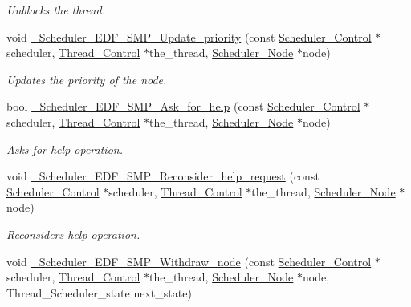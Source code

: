 \begin{DoxyCompactItemize}
\begin{DoxyCompactList}\small\item\em Unblocks the thread. \end{DoxyCompactList}\item 
void \mbox{\hyperlink{group__RTEMSScoreSchedulerSMPEDF_ga29d052b575ef1287c7317eaa98c79765}{\+\_\+\+Scheduler\+\_\+\+E\+D\+F\+\_\+\+S\+M\+P\+\_\+\+Update\+\_\+priority}} (const \mbox{\hyperlink{struct__Scheduler__Control}{Scheduler\+\_\+\+Control}} $\ast$scheduler, \mbox{\hyperlink{struct__Thread__Control}{Thread\+\_\+\+Control}} $\ast$the\+\_\+thread, \mbox{\hyperlink{structScheduler__Node}{Scheduler\+\_\+\+Node}} $\ast$node)
\begin{DoxyCompactList}\small\item\em Updates the priority of the node. \end{DoxyCompactList}\item 
bool \mbox{\hyperlink{group__RTEMSScoreSchedulerSMPEDF_gab78f36571187b6c516ebcd4ac03a6822}{\+\_\+\+Scheduler\+\_\+\+E\+D\+F\+\_\+\+S\+M\+P\+\_\+\+Ask\+\_\+for\+\_\+help}} (const \mbox{\hyperlink{struct__Scheduler__Control}{Scheduler\+\_\+\+Control}} $\ast$scheduler, \mbox{\hyperlink{struct__Thread__Control}{Thread\+\_\+\+Control}} $\ast$the\+\_\+thread, \mbox{\hyperlink{structScheduler__Node}{Scheduler\+\_\+\+Node}} $\ast$node)
\begin{DoxyCompactList}\small\item\em Asks for help operation. \end{DoxyCompactList}\item 
void \mbox{\hyperlink{group__RTEMSScoreSchedulerSMPEDF_gacf0e0de29eff2145dff64429f0651deb}{\+\_\+\+Scheduler\+\_\+\+E\+D\+F\+\_\+\+S\+M\+P\+\_\+\+Reconsider\+\_\+help\+\_\+request}} (const \mbox{\hyperlink{struct__Scheduler__Control}{Scheduler\+\_\+\+Control}} $\ast$scheduler, \mbox{\hyperlink{struct__Thread__Control}{Thread\+\_\+\+Control}} $\ast$the\+\_\+thread, \mbox{\hyperlink{structScheduler__Node}{Scheduler\+\_\+\+Node}} $\ast$node)
\begin{DoxyCompactList}\small\item\em Reconsiders help operation. \end{DoxyCompactList}\item 
void \mbox{\hyperlink{group__RTEMSScoreSchedulerSMPEDF_gaf16b97fb20c6d49d2a086893f728bd5d}{\+\_\+\+Scheduler\+\_\+\+E\+D\+F\+\_\+\+S\+M\+P\+\_\+\+Withdraw\+\_\+node}} (const \mbox{\hyperlink{struct__Scheduler__Control}{Scheduler\+\_\+\+Control}} $\ast$scheduler, \mbox{\hyperlink{struct__Thread__Control}{Thread\+\_\+\+Control}} $\ast$the\+\_\+thread, \mbox{\hyperlink{structScheduler__Node}{Scheduler\+\_\+\+Node}} $\ast$node, Thread\+\_\+\+Scheduler\+\_\+state next\+\_\+state)

\end{DoxyCompactItemize}
